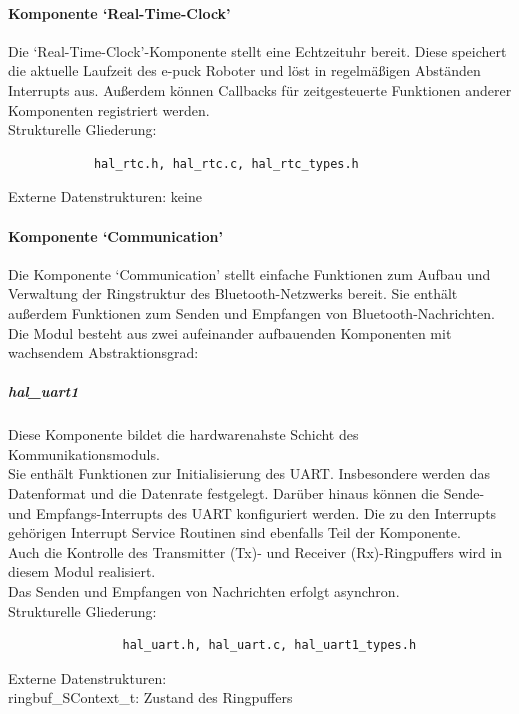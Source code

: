 \documentclass[10pt,a4paper]{article}
\begin{document}
			\paragraph*{Komponente `Real-Time-Clock'}
			Die `Real-Time-Clock'-Komponente stellt eine Echtzeituhr bereit. Diese speichert die aktuelle Laufzeit des e-puck Roboter und löst in
			regelmäßigen Abständen Interrupts aus.
			Außerdem können Callbacks für zeitgesteuerte Funktionen anderer Komponenten registriert werden. \\
			
			Strukturelle Gliederung:
			\begin{verbatim}  
			hal_rtc.h, hal_rtc.c, hal_rtc_types.h
			\end{verbatim}
			
			Externe Datenstrukturen: keine
			
			\paragraph*{Komponente `Communication'}
			Die Komponente `Communication' stellt einfache Funktionen zum Aufbau und Verwaltung der Ringstruktur des Bluetooth-Netzwerks bereit.
			Sie enthält außerdem Funktionen zum Senden und Empfangen von Bluetooth-Nachrichten.\\
			 
			Die Modul besteht aus zwei aufeinander aufbauenden Komponenten mit wachsendem Abstraktionsgrad:
			
				\subparagraph*{hal\_uart1}
				Diese Komponente bildet die hardwarenahste Schicht des Kommunikationsmoduls. \\
				Sie enthält Funktionen zur Initialisierung des UART. Insbesondere werden das Datenformat und die Datenrate festgelegt.
				Darüber hinaus können die Sende- und Empfangs-Interrupts des UART konfiguriert werden. Die zu den Interrupts gehörigen Interrupt
				Service Routinen sind ebenfalls Teil der Komponente. \\
				Auch die Kontrolle des Transmitter (Tx)- und Receiver (Rx)-Ringpuffers wird in diesem Modul realisiert. \\
				Das Senden und Empfangen von Nachrichten erfolgt asynchron. \\
				
				Strukturelle Gliederung:
				\begin{verbatim}  
				hal_uart.h, hal_uart.c, hal_uart1_types.h
				\end{verbatim}
				
				Externe Datenstrukturen: \\
				ringbuf\_SContext\_t: Zustand des Ringpuffers
				
\end{document}
